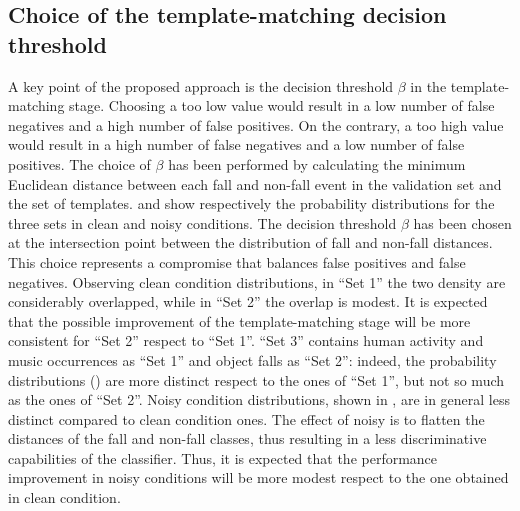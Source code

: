 \subsection{Choice of the template-matching decision threshold}\label{ssec:templateThreshold}
A key point of the proposed approach is the decision threshold $\beta$ in the template-matching stage. Choosing a too low value would result in a low number of false negatives and a high number of false positives. On the contrary, a too high value would result in a high number of false negatives and a low number of false positives. The choice of $\beta$ has been performed by calculating the minimum Euclidean distance between each fall and non-fall event in the validation set and the set of templates.  and  show respectively the probability distributions for the three sets in clean and noisy conditions. The decision threshold $\beta$ has been chosen at the intersection point between the distribution of fall and non-fall distances. This choice represents a compromise that balances false positives and false negatives.
Observing clean condition distributions, in ``Set 1'' the two density are considerably overlapped, while in ``Set 2'' the overlap is modest. It is expected that the possible improvement of the template-matching stage will be more consistent for ``Set 2'' respect to ``Set 1''. ``Set 3'' contains human activity and music occurrences as ``Set 1'' and object falls as ``Set 2'': indeed, the probability distributions () are more distinct respect to the ones of ``Set 1'', but not so much as the ones of ``Set 2''.
Noisy condition distributions, shown in , are in general less distinct compared to clean condition ones. The effect of noisy is to flatten the distances of the fall and non-fall classes, thus resulting in a less discriminative capabilities of the classifier. Thus, it is expected that the performance improvement in noisy conditions will be more modest respect to the one obtained in clean condition.
\vfill
